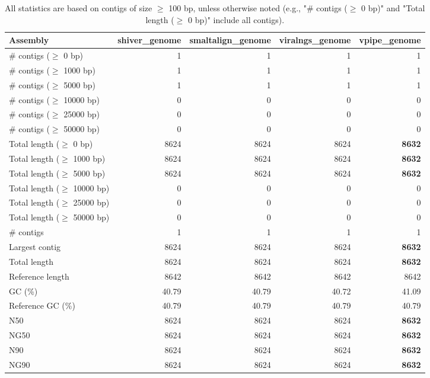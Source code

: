 \documentclass[12pt,a4paper]{article}
\begin{document}
\begin{table}[ht]
\begin{center}
\caption{All statistics are based on contigs of size $\geq$ 100 bp, unless otherwise noted (e.g., "\# contigs ($\geq$ 0 bp)" and "Total length ($\geq$ 0 bp)" include all contigs).}
\begin{tabular}{|l*{4}{|r}|}
\hline
Assembly & shiver\_genome & smaltalign\_genome & viralngs\_genome & vpipe\_genome \\ \hline
\# contigs ($\geq$ 0 bp) & 1 & 1 & 1 & 1 \\ \hline
\# contigs ($\geq$ 1000 bp) & 1 & 1 & 1 & 1 \\ \hline
\# contigs ($\geq$ 5000 bp) & 1 & 1 & 1 & 1 \\ \hline
\# contigs ($\geq$ 10000 bp) & 0 & 0 & 0 & 0 \\ \hline
\# contigs ($\geq$ 25000 bp) & 0 & 0 & 0 & 0 \\ \hline
\# contigs ($\geq$ 50000 bp) & 0 & 0 & 0 & 0 \\ \hline
Total length ($\geq$ 0 bp) & 8624 & 8624 & 8624 & {\bf 8632} \\ \hline
Total length ($\geq$ 1000 bp) & 8624 & 8624 & 8624 & {\bf 8632} \\ \hline
Total length ($\geq$ 5000 bp) & 8624 & 8624 & 8624 & {\bf 8632} \\ \hline
Total length ($\geq$ 10000 bp) & 0 & 0 & 0 & 0 \\ \hline
Total length ($\geq$ 25000 bp) & 0 & 0 & 0 & 0 \\ \hline
Total length ($\geq$ 50000 bp) & 0 & 0 & 0 & 0 \\ \hline
\# contigs & 1 & 1 & 1 & 1 \\ \hline
Largest contig & 8624 & 8624 & 8624 & {\bf 8632} \\ \hline
Total length & 8624 & 8624 & 8624 & {\bf 8632} \\ \hline
Reference length & 8642 & 8642 & 8642 & 8642 \\ \hline
GC (\%) & 40.79 & 40.79 & 40.72 & 41.09 \\ \hline
Reference GC (\%) & 40.79 & 40.79 & 40.79 & 40.79 \\ \hline
N50 & 8624 & 8624 & 8624 & {\bf 8632} \\ \hline
NG50 & 8624 & 8624 & 8624 & {\bf 8632} \\ \hline
N90 & 8624 & 8624 & 8624 & {\bf 8632} \\ \hline
NG90 & 8624 & 8624 & 8624 & {\bf 8632} \\ \hline

\end{tabular}
\end{center}
\end{table}
\end{document}
